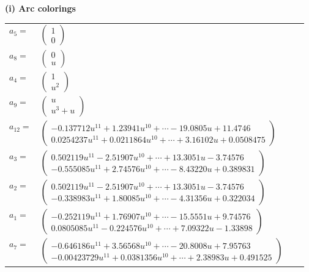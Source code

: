 \documentclass[1p]{elsarticle_modified}
\theoremstyle{definition}
\begin{document}
\flushleft \textbf{(i) Arc colorings}\\
\begin{tabular}{m{7pt} m{180pt} m{7pt} m{180pt} }
\flushright $a_{5}=$&$\begin{pmatrix}1\\0\end{pmatrix}$ \\
\flushright $a_{8}=$&$\begin{pmatrix}0\\u\end{pmatrix}$ \\
\flushright $a_{4}=$&$\begin{pmatrix}1\\u^2\end{pmatrix}$ \\
\flushright $a_{9}=$&$\begin{pmatrix}u\\u^3+u\end{pmatrix}$ \\
\flushright $a_{12}=$&$\begin{pmatrix}-0.137712 u^{11}+1.23941 u^{10}+\cdots-19.0805 u+11.4746\\0.0254237 u^{11}+0.0211864 u^{10}+\cdots+3.16102 u+0.0508475\end{pmatrix}$ \\
\flushright $a_{3}=$&$\begin{pmatrix}0.502119 u^{11}-2.51907 u^{10}+\cdots+13.3051 u-3.74576\\-0.555085 u^{11}+2.74576 u^{10}+\cdots-8.43220 u+0.389831\end{pmatrix}$ \\
\flushright $a_{2}=$&$\begin{pmatrix}0.502119 u^{11}-2.51907 u^{10}+\cdots+13.3051 u-3.74576\\-0.338983 u^{11}+1.80085 u^{10}+\cdots-4.31356 u+0.322034\end{pmatrix}$ \\
\flushright $a_{1}=$&$\begin{pmatrix}-0.252119 u^{11}+1.76907 u^{10}+\cdots-15.5551 u+9.74576\\0.0805085 u^{11}-0.224576 u^{10}+\cdots+7.09322 u-1.33898\end{pmatrix}$ \\
\flushright $a_{7}=$&$\begin{pmatrix}-0.646186 u^{11}+3.56568 u^{10}+\cdots-20.8008 u+7.95763\\-0.00423729 u^{11}+0.0381356 u^{10}+\cdots+2.38983 u+0.491525\end{pmatrix}$ \\

\end{tabular}
\end{document}
